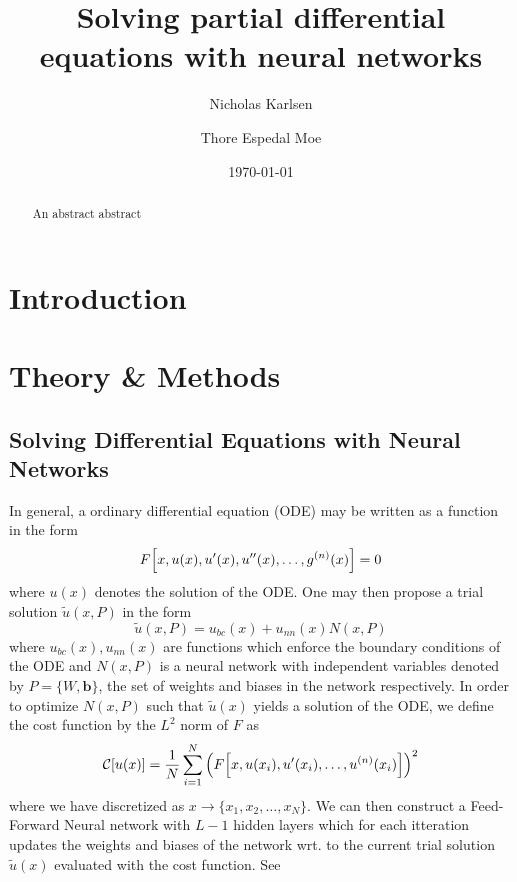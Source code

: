 \documentclass[reprint, english, nofootinbib]{revtex4-2}
\begin{document}
\title{Solving partial differential equations with neural networks}
\author{Nicholas Karlsen}
\author{Thore Espedal Moe}
\date{\today}

\begin{abstract}
    An abstract abstract
\end{abstract}

\maketitle

\section{Introduction}

\section{Theory \& Methods}

\subsection{Solving Differential Equations with Neural Networks}
\noindent
In general, a ordinary differential equation (ODE) may be written as a function in the form
\begin{equation}
    F \qty[x, u(x), u'(x), u''(x), \dots, g^{(n)}(x)] = 0
\end{equation}    
where $u(x)$ denotes the solution of the ODE. One may then propose a trial solution $\tilde u(x,P)$ in the form
\begin{equation}
    \tilde u(x, P) = u_{bc}(x) + u_{nn}(x)N(x, P) 
\end{equation}
where $u_{bc}(x), u_{nn}(x)$ are functions which enforce the boundary conditions of the ODE and $N(x, P)$ is a neural network with independent variables denoted by $P = \{W, \pmb b\}$, the set of weights and biases in the network respectively. In order to optimize $N(x, P)$ such that $\tilde u(x)$ yields a solution of the ODE, we define the cost function by the $L^2$ norm of $F$ as
\begin{equation}
    \mathcal C\qty[u\qty(x)] = \frac{1}{N} \sum_{i=1}^{N}\qty(F\qty[x, u(x_i), u'(x_i), \dots, u^{(n)}(x_i)])^2
\end{equation}
where we have discretized as $x \rightarrow \{x_1, x_2 ,\dots, x_{N}\}$. We can then construct a Feed-Forward Neural network with $L-1$ hidden layers which for each itteration updates the weights and biases of the network wrt. to the current trial solution $\tilde u(x)$ evaluated with the cost function. See \cite{4155_project_2}
\end{document}
